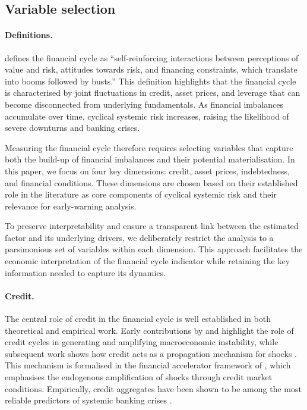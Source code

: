 \subsection{Variable selection}

\paragraph{Definitions.}
\citet{borio2014financial} defines the financial cycle as ``self-reinforcing interactions between perceptions of value and risk, attitudes towards risk, and financing constraints, which translate into booms followed by busts.'' This definition highlights that the financial cycle is characterised by joint fluctuations in credit, asset prices, and leverage that can become disconnected from underlying fundamentals. As financial imbalances accumulate over time, cyclical systemic risk increases, raising the likelihood of severe downturns and banking crises.

Measuring the financial cycle therefore requires selecting variables that capture both the build-up of financial imbalances and their potential materialisation. In this paper, we focus on four key dimensions: credit, asset prices, indebtedness, and financial conditions. These dimensions are chosen based on their established role in the literature as core components of cyclical systemic risk and their relevance for early-warning analysis.

To preserve interpretability and ensure a transparent link between the estimated factor and its underlying drivers, we deliberately restrict the analysis to a parsimonious set of variables within each dimension. This approach facilitates the economic interpretation of the financial cycle indicator while retaining the key information needed to capture its dynamics.

\paragraph{Credit.}
The central role of credit in the financial cycle is well established in both theoretical and empirical work. Early contributions by \citet{fisher1933debt} and \citet{minsky1977financial} highlight the role of credit cycles in generating and amplifying macroeconomic instability, while subsequent work shows how credit acts as a propagation mechanism for shocks \citep{bernanke1983non, gertler1988financial}. This mechanism is formalised in the financial accelerator framework of \citet{bernanke1999financial}, which emphasises the endogenous amplification of shocks through credit market conditions. Empirically, credit aggregates have been shown to be among the most reliable predictors of systemic banking crises \citep{schularick2012credit}.


